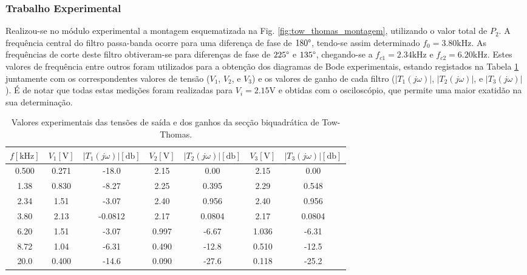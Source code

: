 \subsubsection{Trabalho Experimental}
Realizou-se no módulo experimental a montagem esquematizada na Fig. \ref{fig:tow_thomas_montagem}, utilizando o valor total de $P_2$. A frequência central do filtro passa-banda ocorre para uma diferença de fase de $180 \degree$, tendo-se assim determinado $f_0 = 3.80 \si{\kilo \hertz}$. As frequências de corte deste filtro obtiveram-se para diferenças de fase de $225 \degree$ e $135 \degree$, chegando-se a $f_{c1} = 2.34 \si{\kilo \hertz}$ e $f_{c2} = 6.20 \si{\kilo \hertz}$. Estes valores de frequência entre outros foram utilizados para a obtenção dos diagramas de Bode experimentais, estando registados na Tabela \ref{tab:dados_bode_exp_TT} juntamente com os correspondentes valores de tensão ($V_1$, $V_2$, e $V_3$) e os valores de ganho de cada filtro ($\left |T_1(j\omega)\right|$, $\left |T_2(j\omega)\right|$, e $\left |T_3(j\omega)\right|$). É de notar que todas estas medições foram realizadas para $V_i = 2.15 \si{\volt}$ e obtidas com o osciloscópio, que permite uma maior exatidão na sua determinação.

\begin{table}[ht]
    \centering
    \caption{Valores experimentais das tensões de saída e dos ganhos da secção biquadrática de Tow-Thomas.}
    \begin{tabular}{ccccccc}
        \hline
        $f [\si{\kilo \hertz}]$ & $V_1 [\si{\volt}]$ & $\left |T_1 (j \omega) \right| [\si{\decibel}]$ & $V_2 [\si{\volt}]$ & $\left |T_2 (j \omega) \right| [\si{\decibel}]$ & $V_3 [\si{\volt}]$ & $\left |T_3 (j \omega) \right| [\si{\decibel}]$\\
        \hline
        0.500   & 0.271 & -18.0 & 2.15  & 0.00  & 2.15  & 0.00 \vspace{0.2cm}\\
        1.38    & 0.830 & -8.27 & 2.25  & 0.395  & 2.29  & 0.548  \vspace{0.2cm}\\
        2.34    & 1.51  & -3.07 & 2.40  & 0.956  & 2.40  & 0.956  \vspace{0.2cm}\\
        3.80    & 2.13  & -0.0812& 2.17  & 0.0804 & 2.17  & 0.0804 \vspace{0.2cm}\\
        6.20    & 1.51 & -3.07 & 0.997 & -6.67 & 1.036 & -6.31 \vspace{0.2cm}\\
        8.72    & 1.04  & -6.31 & 0.490 & -12.8 & 0.510 & -12.5 \vspace{0.2cm}\\
        20.0    & 0.400 & -14.6 & 0.090 & -27.6 & 0.118 & -25.2 \vspace{0.2cm}\\
        \hline
    \end{tabular}
    \label{tab:dados_bode_exp_TT}
\end{table}

